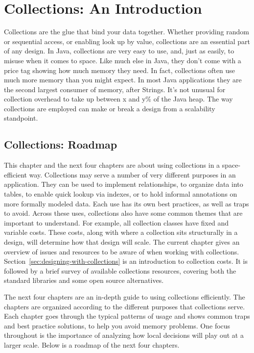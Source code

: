 \chapter{Collections: An Introduction}
\label{chapter:brief-introduction-collections}

Collections are the glue that bind your data together.  Whether 
providing random or sequential access, or enabling
look up by value, collections are an essential part of any
design. In Java, collections are very easy to use, and, just as easily, to misuse when
it comes to space. Like much else in Java, they don't come with a price tag
showing how much memory they need. In fact, collections
often use much more memory than you might expect. In most Java applications they are the second largest consumer of memory, after
Strings. It's not unusual for collection overhead to take up between x and y\%
of the Java heap. The way collections are employed can make
or break a design from a scalability standpoint.


\section{Collections: Roadmap}
This chapter and the next four chapters are about using
collections in a space-efficient way.  Collections may serve a number of very
different purposes in an application. They can be used to implement relationships, to organize data into tables,
to enable quick lookup via indexes, or to hold informal annotations on more formally modeled data. Each use
has its own best practices, as well as traps to avoid. Across these
uses, collections also have some common themes that are important to understand. For example,
all collection classes have fixed and variable costs.
These costs, along with where a collection sits structurally in a design, will determine how that
design will scale. The current chapter gives an overview of issues and
resources to be aware of when working with collections. Section~\ref{sec:designing-with-collections}
is an introduction to collection costs. It is followed by a
brief survey of available collections resources, covering both the standard libraries and
some open source alternatives.

The next four chapters are an in-depth guide to using collections efficiently. 
The chapters are organized according to the
different purposes that collections serve. Each chapter goes through the typical
patterns of usage and shows common traps and best practice solutions, to help
you avoid memory problems. One focus throughout is the importance of analyzing
how local decisions will play out at a larger scale. Below is a roadmap of the next four chapters.
%

